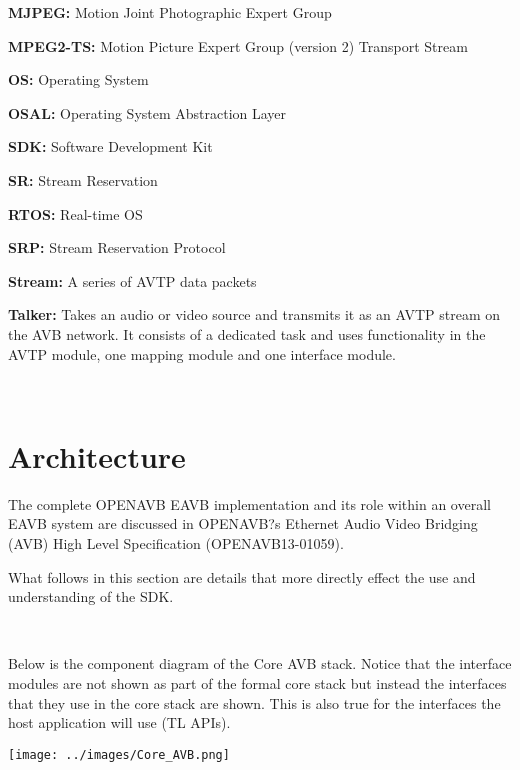 {\bfseries M\+J\+P\+EG\+:} Motion Joint Photographic Expert Group

{\bfseries M\+P\+E\+G2-\/\+TS\+:} Motion Picture Expert Group (version 2) Transport Stream

{\bfseries OS\+:} Operating System

{\bfseries O\+S\+AL\+:} Operating System Abstraction Layer

{\bfseries S\+DK\+:} Software Development Kit

{\bfseries SR\+:} Stream Reservation

{\bfseries R\+T\+OS\+:} Real-\/time OS

{\bfseries S\+RP\+:} Stream Reservation Protocol

{\bfseries Stream\+:} A series of A\+V\+TP data packets

{\bfseries Talker\+:} Takes an audio or video source and transmits it as an A\+V\+TP stream on the A\+VB network. It consists of a dedicated task and uses functionality in the A\+V\+TP module, one mapping module and one interface module.

~\newline
\hypertarget{sdk_overview_sdk_overview_architecture}{}\section{Architecture }\label{sdk_overview_sdk_overview_architecture}
The complete O\+P\+E\+N\+A\+VB E\+A\+VB implementation and its role within an overall E\+A\+VB system are discussed in O\+P\+E\+N\+A\+VB?s Ethernet Audio Video Bridging (A\+VB) High Level Specification (O\+P\+E\+N\+A\+V\+B13-\/01059).

What follows in this section are details that more directly effect the use and understanding of the S\+DK.

~\newline


Below is the component diagram of the Core A\+VB stack. Notice that the interface modules are not shown as part of the formal core stack but instead the interfaces that they use in the core stack are shown. This is also true for the interfaces the host application will use (TL A\+P\+Is).


\begin{DoxyImage}
\texttt{[image: ../images/Core\_AVB.png]}
\caption{Core A\+VB}
\end{DoxyImage}


~\newline


